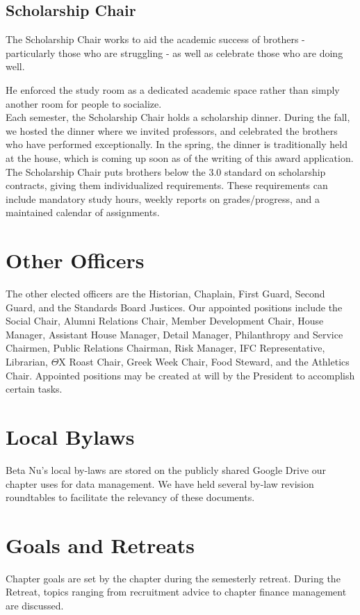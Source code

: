       \subsection*{Scholarship Chair}
	The Scholarship Chair works to aid the academic success of brothers - particularly those who are struggling - as well as celebrate those who are doing well.

	He enforced the study room as a dedicated academic space rather than simply another room for people to socialize. \\

	Each semester, the Scholarship Chair holds a scholarship dinner. During the fall, we hosted the dinner where we invited professors, and celebrated the brothers who have performed exceptionally. In the spring, the dinner is traditionally held at the house, which is coming up soon as of the writing of this award application. \\

	The Scholarship Chair puts brothers below the 3.0 standard on scholarship contracts, giving them individualized requirements. These requirements can include mandatory study hours, weekly reports on grades/progress, and a maintained calendar of assignments. \\
	
    \section*{Other Officers}
	The other elected officers are the Historian, Chaplain, First Guard, Second Guard, and the Standards Board Justices. Our appointed positions include the Social Chair, Alumni Relations Chair, Member Development Chair, House Manager, Assistant House Manager, Detail Manager, Philanthropy and Service Chairmen, Public Relations Chairman, Risk Manager, IFC Representative, Librarian, $\Theta$X Roast Chair, Greek Week Chair, Food Steward, and the Athletics Chair. Appointed positions may be created at will by the President to accomplish certain tasks.
	
    \section*{Local Bylaws}
	Beta Nu's local by-laws are stored on the publicly shared Google Drive our chapter uses for data management. We have held several by-law revision roundtables to facilitate the relevancy of these documents.
	
    \section*{Goals and Retreats}	
	Chapter goals are set by the chapter during the semesterly retreat. During the Retreat, topics ranging from recruitment advice to chapter finance management are discussed. \\
	
